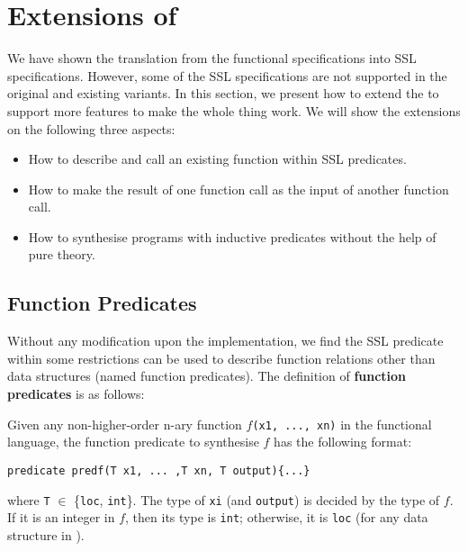 \section{Extensions of \suslik}
\label{sec:suslik-extensions}

We have shown the translation from the functional specifications into
SSL specifications. However, some of the SSL specifications are not
supported in the original \suslik and existing variants.
%
In this section, we present how to extend the \suslik to support more
features to make the whole thing work. We will show the extensions on
the following three aspects:

\begin{itemize}
  \item How to describe and call an existing function within SSL predicates.
  \item How to make the result of one function call as the input of another function call.
  \item How to synthesise programs with inductive predicates without the help of pure theory.
\end{itemize}

\subsection{Function Predicates}
\label{sec:funcPred}

Without any modification upon the implementation, we find the SSL
predicate within some restrictions can be used to describe function
relations other than data structures (named function predicates). The
definition of \textbf{function predicates} is as follows:

\begin{definition}
    \label{def:funcPred}
    \normalfont
    Given any non-higher-order n-ary function $f$\lstinline{(x1, ..., xn)} in the functional language, the function predicate to synthesise $f$ has the following format:
    \begin{lstlisting}[language=SynLang]
    predicate predf(T x1, ... ,T xn, T output){...}
    \end{lstlisting}
%
    where \lstinline{T} $\in$ \{\lstinline{loc}, \lstinline{int}\}.
    The type of \lstinline{xi} (and \lstinline{output}) is decided by
    the type of $f$. If it is an integer in $f$, then its type is
    \lstinline{int}; otherwise, it is \lstinline{loc} (for any data
    structure in \tool).
\end{definition}

